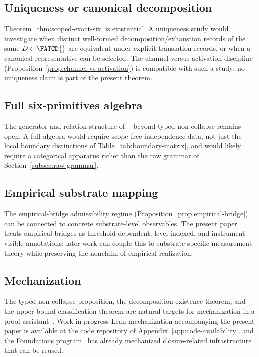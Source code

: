 \subsection{Uniqueness or canonical decomposition}\label{subsec:future-uniqueness}

Theorem~\ref{thm:scoped-exact-six} is existential. A uniqueness study
would investigate when distinct well-formed decomposition/exhaustion
records of the same \(D \in \FATCD{}\) are equivalent under explicit
translation records, or when a canonical representative can be
selected. The channel-versus-activation discipline
(Proposition~\ref{prop:channel-vs-activation}) is compatible with
such a study; no uniqueness claim is part of the present theorem.

\subsection{Full six-primitives algebra}\label{subsec:future-algebra}

The generator-and-relation structure of \Pone{}--\Psix{} beyond
typed non-collapse remains open. A full algebra would require
scope-free independence data, not just the local boundary
distinctions of Table~\ref{tab:boundary-matrix}, and would likely
require a categorical apparatus richer than the raw grammar of
Section~\ref{subsec:raw-grammar}.

\subsection{Empirical substrate mapping}\label{subsec:future-substrate}

The empirical-bridge admissibility regime
(Proposition~\ref{prop:empirical-bridge}) can be connected to
concrete substrate-level observables. The present paper treats
empirical bridges as threshold-dependent, level-indexed, and
instrument-visible annotations; later work can couple this to
substrate-specific measurement theory while preserving the nonclaim
of empirical realization.

\subsection{Mechanization}\label{subsec:future-mechanization}

The typed non-collapse proposition, the decomposition-existence
theorem, and the upper-bound classification theorem are natural
targets for mechanization in a proof
assistant~\citep{DeMouraUllrich2021}. Work-in-progress Lean
mechanization accompanying the present paper is available at the
code repository of Appendix~\ref{app:code-availability}, and the
Foundations program~\citep{Tsiokos2026SixBirdsFoundations} has
already mechanized closure-related infrastructure that can be
reused.

